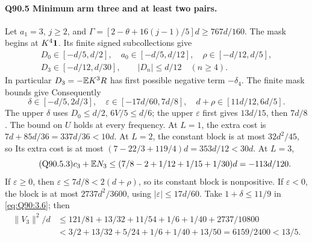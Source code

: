 \paragraph{Q90.5 Minimum arm three and at least two pairs.}
Let \(a_1=\allowbreak 3\), \(j\ge\allowbreak 2\), and
\(\Gamma=\allowbreak [2-\theta+16(j-1)/5]d\ge\allowbreak 767d/160\).
The mask begins at \(K^4\mathbf1\). Its finite signed subcollections give
\begin{equation}\tag{Q90.5.1}\label{eq:Q90:5.1}
\begin{gathered}
D_0\in[-d/5,d/2],\quad a_0\in[-d/5,d/12],\quad
\rho\in[-d/12,d/5],\\
D_3\in[-d/12,d/30],\qquad |D_n|\le d/12\quad(n\ge4).
\end{gathered}
\end{equation}
In particular \(D_3=\allowbreak -\mathbb E K^3R\) has first possible negative term
\(-\delta_4\). The finite mask bounds give
Consequently
\begin{equation}\tag{Q90.5.2}\label{eq:Q90:5.2}
\delta\in[-d/5,2d/3],\quad
\varepsilon\in[-17d/60,7d/8],\quad
d+\rho\in[11d/12,6d/5].
\end{equation}
The upper \(\delta\) uses \(D_0\le\allowbreak  d/2\), \(6V/5\le\allowbreak  d/6\);
the upper \(\varepsilon\) first gives \(13d/15\), then \(7d/8\).
The bound on \(U\) holds at every frequency.
At \(L=\allowbreak 1\), the extra cost is
\(7d+85d/36=\allowbreak 337d/36<\allowbreak 10d\).
At \(L=\allowbreak 2\), the constant block is at most \(32d^2/45\), so
Its extra cost is at most
\((7-22/3+119/4)d=\allowbreak 353d/12<\allowbreak 30d\).
At \(L=\allowbreak 3\),
\begin{equation}\tag{Q90.5.3}\label{eq:Q90:5.3}
c_3+\mathbb E N_3\le(7/8-2+1/12+1/15+1/30)d=-113d/120.
\end{equation}
If \(\varepsilon\ge\allowbreak 0\), then
\(\varepsilon\le\allowbreak 7d/8<\allowbreak 2(d+\rho)\), so its constant block is nonpositive.
If \(\varepsilon<\allowbreak 0\), the block is at most \(2737d^2/3600\),
using \(|\varepsilon|\le\allowbreak 17d/60\).
Take \(1+\delta\le\allowbreak 11/9\) in \eqref{eq:Q90:3.6}; then
\begin{equation}\tag{Q90.5.4}\label{eq:Q90:5.4}
\begin{aligned}
\|V_3\|^2/d
&\le121/81+13/32+11/54+1/6+1/40+2737/10800\\
&<3/2+13/32+5/24+1/6+1/40+13/50
=6159/2400<13/5.
\end{aligned}
\end{equation}
